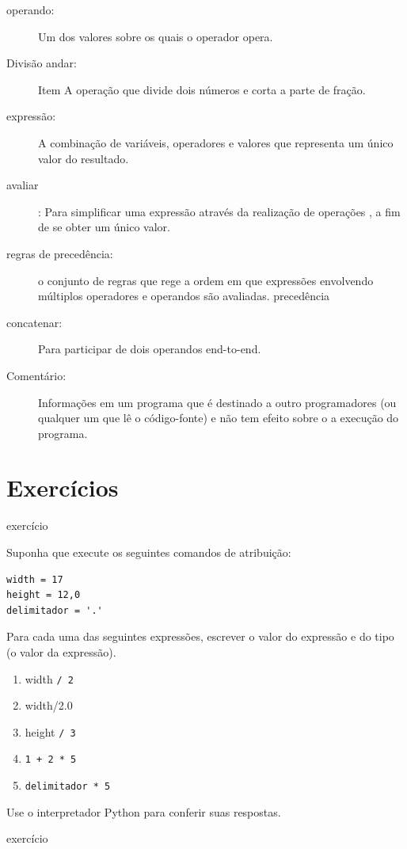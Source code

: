 \documentclass[10pt]{book}
\begin{document}
\begin{description}
\item[operando:] Um dos valores sobre os quais o operador opera.

\item[Divisão andar:] Item A operação que divide dois números e corta
a parte de fração.

\item[expressão:] A combinação de variáveis, operadores e valores que
representa um único valor do resultado.

\item[avaliar]: Para simplificar uma expressão através da realização de operações
, a fim de se obter um único valor.

\item[regras de precedência:] o conjunto de regras que rege a ordem em que
expressões envolvendo múltiplos operadores e operandos são avaliadas.
\index{} precedência

\item[concatenar:] Para participar de dois operandos end-to-end.

\item[Comentário:] Informações em um programa que é destinado a outro
programadores (ou qualquer um que lê o código-fonte) e não tem efeito sobre o
a execução do programa.

\end{description}


\section{Exercícios}

\begin{} exercício

Suponha que execute os seguintes comandos de atribuição:

\begin{verbatim}
width = 17
height = 12,0
delimitador = '.'
\end{verbatim}

Para cada uma das seguintes expressões, escrever o valor do
expressão e do tipo (o valor da expressão).

\begin{enumerate}

\item{width \tt / 2}

\item{width/2.0 \tt}

\item{height \tt / 3}

\item{\tt 1 + 2 * 5}

\item{\tt delimitador * 5}

\end{enumerate}

Use o interpretador Python para conferir suas respostas.
\end{} exercício
\end{document}

